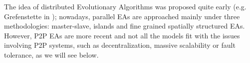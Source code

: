 


The idea of distributed Evolutionary Algorithms was proposed quite
early (e.g. Grefenstette in \cite{grefenstette}); nowadays, parallel
EAs are approached mainly under three methodologies: 
 master-slave, islands and fine grained spatially structured
 EAs. However, P2P EAs are more recent and not all the models fit with
 the issues involving P2P systems, such as decentralization, massive
 scalability or fault tolerance, as we will see below.

